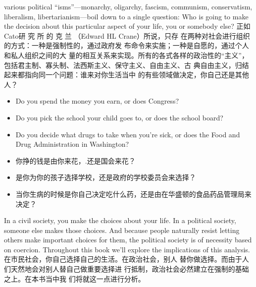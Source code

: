 \begin{paracol}{2}
various political ``isms''---monarchy, oligarchy, fascism, communism, conservatism, liberalism, libertarianism---boil down
to a single question: Who is going to make the decision about
this particular aspect of your life, you or somebody else?
\switchcolumn
正如Cato研 究 所 的 克 兰 （Edward HL Crane）所说，只存
在两种对社会进行组织的方式：一种是强制性的，通过政府发
布命令来实施；一种是自愿的，通过个人和私人组织之间的大
量的相互关系来实现。所有的各式各样的政治性的“主义”，
包括君主制、寡头制、法西斯主义、保守主义、自由主义、古
典自由主义，归结起来都指向同一个问题：谁来对你生活当中
的有些领域做决定，你自己还是其他人？
\switchcolumn*
\begin{itemize}
	\item Do you spend the money you earn, or does Congress?
	\item Do you pick the school your child goes to, or does the school board?
	\item Do you decide what drugs to take when you're sick, or does the Food and Drug Administration in Washington?
\end{itemize}
\switchcolumn
\begin{itemize}
	\item 你挣的钱是由你来花，.还是国会来花？
	\item 是你为你的孩子选择学校，还是政府的学校委员会来选择？
	\item 当你生病的时候是你自己决定吃什么药，还是由在华盛顿的食品药品管理局来决定？
\end{itemize}
\switchcolumn*
In a civil society, you make the choices about your life. In a
political society, someone else makes those choices. And because
people naturally resist letting others make important choices
for them, the political society is of necessity based on coercion.
Throughout this book we'll explore the implications of this
analysis.
\switchcolumn
在市民社会，你自己选择自己的生活。在政治社会，别人
替你做选择。而由于人们天然地会对别人替自己做重要选择进
行抵制，政治社会必然建立在强制的基础之上。在本书当中我
们将就这一点进行分析。


\end{paracol}
